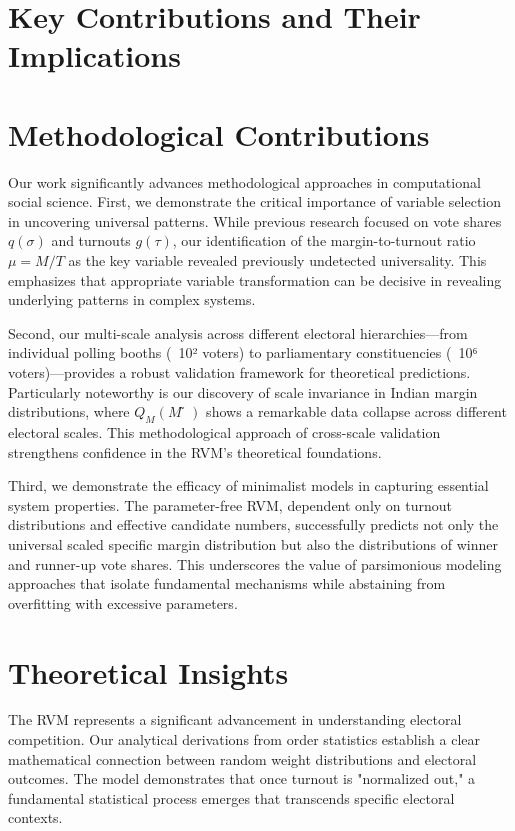 \section{Key Contributions and Their Implications}

\section{Methodological Contributions}

Our work significantly advances methodological approaches in computational social science. First, we demonstrate the critical importance of variable selection in uncovering universal patterns. While previous research focused on vote shares $q(\sigma)$ and turnouts $g(\tau)$, our identification of the margin-to-turnout ratio $\mu = M/T$ as the key variable revealed previously undetected universality. This emphasizes that appropriate variable transformation can be decisive in revealing underlying patterns in complex systems.

Second, our multi-scale analysis across different electoral hierarchies—from individual polling booths (~10² voters) to parliamentary constituencies (~10⁶ voters)—provides a robust validation framework for theoretical predictions. Particularly noteworthy is our discovery of scale invariance in Indian margin distributions, where $Q_M(M̃)$ shows a remarkable data collapse across different electoral scales. This methodological approach of cross-scale validation strengthens confidence in the RVM's theoretical foundations.

Third, we demonstrate the efficacy of minimalist models in capturing essential system properties. The parameter-free RVM, dependent only on turnout distributions and effective candidate numbers, successfully predicts not only the universal scaled specific margin distribution but also the distributions of winner and runner-up vote shares. This underscores the value of parsimonious modeling approaches that isolate fundamental mechanisms while abstaining from overfitting with excessive parameters.

\section{Theoretical Insights}

The RVM represents a significant advancement in understanding electoral competition. Our analytical derivations from order statistics establish a clear mathematical connection between random weight distributions and electoral outcomes. The model demonstrates that once turnout is "normalized out," a fundamental statistical process emerges that transcends specific electoral contexts.


